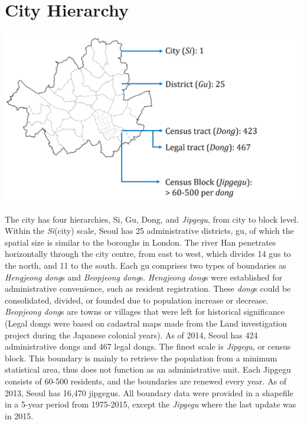 \documentclass[]{book}
\theoremstyle{definition}
\theoremstyle{definition}
\theoremstyle{definition}
\theoremstyle{remark}
\begin{document}
\section{City Hierarchy}\label{city-hierarchy}

\begin{center}\includegraphics[width=16.82in]{images/02_boundary} \end{center}

The city has four hierarchies, Si, Gu, Dong, and \emph{Jipgegu}, from
city to block level. Within the \emph{Si}(city) scale, Seoul has 25
administrative districts, gu, of which the spatial size is similar to
the boroughs in London. The river Han penetrates horizontally through
the city centre, from east to west, which divides 14 gus to the north,
and 11 to the south. Each gu comprises two types of boundaries as
\emph{Hengjeong dong}s and \emph{Beopjeong dong}s. \emph{Hengjeong
dong}s were established for administrative convenience, such as resident
registration. These \emph{dong}s could be consolidated, divided, or
founded due to population increase or decrease. \emph{Beopjeong dong}s
are towns or villages that were left for historical significance (Legal
dongs were based on cadastral maps made from the Land investigation
project during the Japanese colonial years). As of 2014, Seoul has 424
administrative dongs and 467 legal dongs. The finest scale is
\emph{Jipgegu}, or census block. This boundary is mainly to retrieve the
population from a minimum statistical area, thus does not function as an
administrative unit. Each Jipgegu consists of 60-500 residents, and the
boundaries are renewed every year. As of 2013, Seoul has 16,470
jipgegus. All boundary data were provided in a shapefile in a 5-year
period from 1975-2015, except the \emph{Jipgegu} where the last update
was in 2015.
\end{document}
